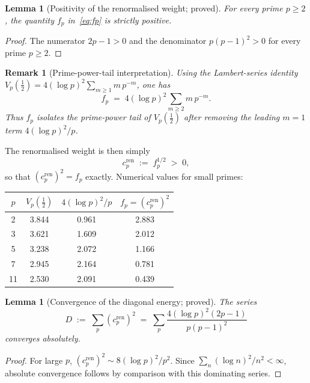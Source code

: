 \documentclass[11pt]{article}
\newtheorem{lemma}[theorem]{Lemma}
\newtheorem*{remark}{Remark}
\newcommand{\cren}{c_p^{\mathrm{ren}}}
\begin{document}
\begin{lemma}[Positivity of the renormalised weight; proved]\label{lem:fp-pos}
For every prime $p\ge 2$, the quantity $f_p$
in~\eqref{eq:fp} is strictly positive.
\end{lemma}

\begin{proof}
The numerator $2p-1>0$ and the denominator $p(p-1)^2>0$ for
every prime $p\ge 2$.
\end{proof}

\begin{remark}[Prime-power-tail interpretation]\label{rem:fp-tail}
Using the Lambert-series identity
$V_p(\tfrac12) = 4(\log p)^2\sum_{m\ge1}m\,p^{-m}$,
one has
\[
f_p
\;=\;
4(\log p)^2\sum_{m\ge2}m\,p^{-m}.
\]
Thus $f_p$ isolates the prime-power tail of $V_p(\tfrac12)$
after removing the leading $m=1$ term
$4(\log p)^2/p$.
\end{remark}

The renormalised weight is then simply
\begin{equation}\label{eq:cren}
\cren \;:=\; f_p^{1/2} \;>\; 0,
\end{equation}
so that $(\cren)^2 = f_p$ exactly.
Numerical values for small primes:

\begin{center}
\begin{tabular}{cccc}
\toprule
$p$ & $V_p(\tfrac12)$ & $4(\log p)^2/p$ & $f_p = (\cren)^2$ \\
\midrule
2  & 3.844 & 0.961 & 2.883 \\
3  & 3.621 & 1.609 & 2.012 \\
5  & 3.238 & 2.072 & 1.166 \\
7  & 2.945 & 2.164 & 0.781 \\
11 & 2.530 & 2.091 & 0.439 \\
\bottomrule
\end{tabular}
\end{center}

\begin{lemma}[Convergence of the diagonal energy; proved]\label{lem:D-conv}
The series
\begin{equation}\label{eq:D}
D \;:=\; \sum_p (\cren)^2
\;=\; \sum_p \frac{4(\log p)^2(2p-1)}{p(p-1)^2}
\end{equation}
converges absolutely.
\end{lemma}

\begin{proof}
For large $p$, $(\cren)^2 \sim 8(\log p)^2/p^2$.
Since $\sum_n (\log n)^2/n^2 < \infty$, absolute convergence
follows by comparison with this dominating series.
\end{proof}
\end{document}
